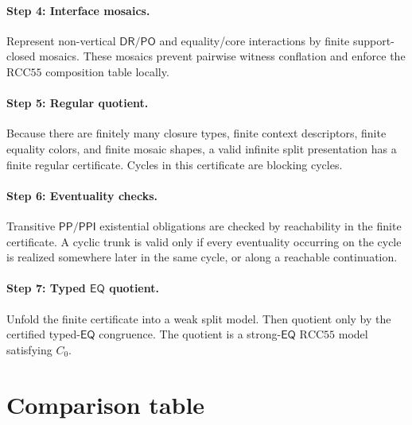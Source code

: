 \documentclass[11pt]{article}
\newcommand{\RCC}{\mathrm{RCC5}}
\newcommand{\PP}{\mathsf{PP}}
\newcommand{\PPI}{\mathsf{PPI}}
\newcommand{\PO}{\mathsf{PO}}
\newcommand{\DR}{\mathsf{DR}}
\newcommand{\EQ}{\mathsf{EQ}}
\theoremstyle{definition}
\theoremstyle{plain}
\begin{document}
\paragraph{Step 4: Interface mosaics.}
Represent non-vertical $\DR/\PO$ and equality/core interactions by finite support-closed mosaics.  These mosaics prevent pairwise witness conflation and enforce the $\RCC5$ composition table locally.

\paragraph{Step 5: Regular quotient.}
Because there are finitely many closure types, finite context descriptors, finite equality colors, and finite mosaic shapes, a valid infinite split presentation has a finite regular certificate.  Cycles in this certificate are blocking cycles.

\paragraph{Step 6: Eventuality checks.}
Transitive $\PP/\PPI$ existential obligations are checked by reachability in the finite certificate.  A cyclic trunk is valid only if every eventuality occurring on the cycle is realized somewhere later in the same cycle, or along a reachable continuation.

\paragraph{Step 7: Typed $\EQ$ quotient.}
Unfold the finite certificate into a weak split model.  Then quotient only by the certified typed-$\EQ$ congruence.  The quotient is a strong-$\EQ$ $\RCC5$ model satisfying $C_0$.

\section{Comparison table}
\end{document}
